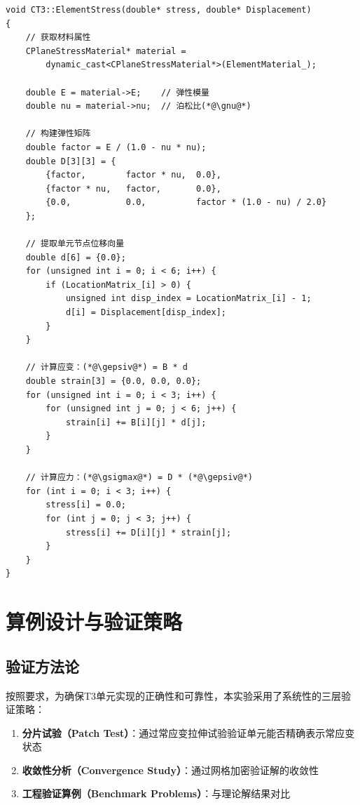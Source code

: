 \documentclass[12pt,a4paper]{article}
\begin{document}
\begin{lstlisting}[caption=单元应力计算实现]
void CT3::ElementStress(double* stress, double* Displacement)
{
    // 获取材料属性
    CPlaneStressMaterial* material = 
        dynamic_cast<CPlaneStressMaterial*>(ElementMaterial_);
    
    double E = material->E;    // 弹性模量
    double nu = material->nu;  // 泊松比(*@\gnu@*)
    
    // 构建弹性矩阵
    double factor = E / (1.0 - nu * nu);
    double D[3][3] = {
        {factor,        factor * nu,  0.0},
        {factor * nu,   factor,       0.0},
        {0.0,           0.0,          factor * (1.0 - nu) / 2.0}
    };
    
    // 提取单元节点位移向量
    double d[6] = {0.0};
    for (unsigned int i = 0; i < 6; i++) {
        if (LocationMatrix_[i] > 0) {
            unsigned int disp_index = LocationMatrix_[i] - 1;
            d[i] = Displacement[disp_index];
        }
    }
    
    // 计算应变：(*@\gepsiv@*) = B * d
    double strain[3] = {0.0, 0.0, 0.0};
    for (unsigned int i = 0; i < 3; i++) {
        for (unsigned int j = 0; j < 6; j++) {
            strain[i] += B[i][j] * d[j];
        }
    }
    
    // 计算应力：(*@\gsigmax@*) = D * (*@\gepsiv@*)
    for (int i = 0; i < 3; i++) {
        stress[i] = 0.0;
        for (int j = 0; j < 3; j++) {
            stress[i] += D[i][j] * strain[j];
        }
    }
}
\end{lstlisting}

\section{算例设计与验证策略}

\subsection{验证方法论}

按照要求，为确保T3单元实现的正确性和可靠性，本实验采用了系统性的三层验证策略：

\begin{enumerate}
    \item \textbf{分片试验（Patch Test）}：通过常应变拉伸试验验证单元能否精确表示常应变状态
    \item \textbf{收敛性分析（Convergence Study）}：通过网格加密验证解的收敛性
    \item \textbf{工程验证算例（Benchmark Problems）}：与理论解结果对比
\end{enumerate}
\end{document}
